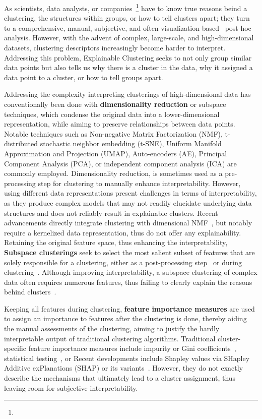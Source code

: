 \documentclass[a4paper,11pt]{article}
\begin{document}
As scientists, data analysts, or companies~\footnote{} have to know true reasons beind a clustering, 
the structures within groups, or how to tell clusters apart; 
they turn to a comprehensive, manual, subjective, and often visualization-based~\cite{todo} post-hoc analysis.
However, with the advent of complex, large-scale, and high-dimensional datasets, 
clustering descriptors increasingly become harder to interpret. 
Addressing this problem, Explainable Clustering seeks to not only group similar data points but also tells us 
why there is a cluster in the data,
why it assigned a data point to a cluster, or 
how to tell groups apart.

Addressing the complexity interpreting clusterings of high-dimensional data has conventionally been done with \textbf{dimensionality reduction} or subspace techniques, which condense the original data into a lower-dimensional representation, while aiming to preserve relationships between data points. 
Notable techniques such as Non-negative Matrix Factorization (NMF), t-distributed stochastic neighbor embedding (t-SNE), Uniform Manifold Approximation and Projection (UMAP), Auto-encoders (AE), Principal Component Analysis (PCA), or independent component analysis (ICA) are commonly employed. 
Dimensionality reduction, is sometimes used as a pre-processing step for clustering to manually enhance interpretability.
However, using different data representations present challenges in terms of interpretability, as they produce complex models that may not readily elucidate underlying data structures and does not reliably result in explainable clusters.
Recent advancements directly integrate clustering with dimensional NMF~\cite{}, but notably require a kernelized data representation, thus do not offer any explainability. 
Retaining the original feature space, thus enhancing the interpretability,
\textbf{Subspace clusterings} seek to select the most salient subset of features that are solely responsible for a clustering, either as a post-processing step~\cite{todo} or during clustering~\cite{todo}.
Although improving interpretability, a subspace clustering of complex data often requires numerous features, thus failing to clearly explain the reasons behind clusters~\cite{todo}. 

Keeping all features during clustering, \textbf{feature importance measures} are used to assign an importance to features after the clustering is done, 
thereby aiding the manual assessments of the clustering,
aiming to justify the hardly interpretable output of traditional clustering algorithms.   
Traditional cluster-specific feature importance measures include impurity or Gini coefficients~\cite{todo}, statistical testing~\cite{todo}, or 
Recent developments include Shapley values via SHapley Additive exPlanations (SHAP) or its variants~\cite{todo}.
However, they do not exactly describe the mechanisms that ultimately lead to a cluster assignment, 
thus leaving room for subjective interpretability.
\end{document}
